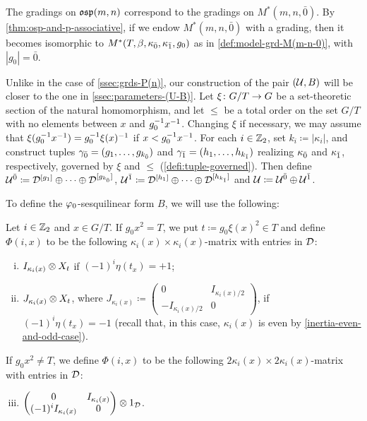The gradings on $\mathfrak{osp}(m,n)$ correspond to the gradings on $M^*(m, n, \bar 0)$. 
By \cref{thm:osp-and-p-associative}, if we endow $M^*(m, n, \bar 0)$ with a grading, then it becomes isomorphic to $M^*(T, \beta, \kappa_{\bar{0}}, \kappa_{\bar{1}}, g_0)$ as in \cref{def:model-grd-M(m-n-0)}, with $|g_0| = \bar 0$. 

Unlike in the case of \cref{ssec:grds-P(n)}, our construction of the pair $(\mathcal U, B)$ will be closer to the one in \cref{ssec:parameters-(U-B)}. 
Let $\xi\colon G/T \to G$ be a set-theoretic section of the natural homomorphism, and let $\leq$ be a total order on the set $G/T$ with no elements between $x$ and $g_0^{-1} x^{-1}$. 
Changing $\xi$ if necessary, we may assume that $\xi(g_0^{-1} x^{-1}) = g_0^{-1} \xi(x)^{-1}$ if $x < g_0^{-1} x^{-1}$. 
For each $i \in \mathbb{Z}_2$, set $k_i \coloneqq |\kappa_i|$, and construct tuples $\gamma_{\bar{0}} = (g_1, \ldots, g_{k_{\bar{0}}})$ and $\gamma_{\bar{1}} = (h_1, \ldots, h_{k_{\bar{1}}})$ realizing $\kappa_{\bar{0}}$ and $\kappa_{\bar{1}}$, respectively, governed by $\xi$ and $\leq$ (\cref{defi:tuple-governed}). 
Then define $\mathcal U^{\bar0} \coloneqq \mathcal{D}^{[g_1]} \oplus \cdots \oplus \mathcal{D}^{[g_{k_{\bar{0}}}]}$, $\mathcal U^{\bar1} \coloneqq \mathcal{D}^{[h_1]} \oplus \cdots \oplus \mathcal{D}^{[h_{k_{\bar{1}}}]}$ and $\mathcal U \coloneqq \mathcal U^{\bar0} \oplus \mathcal U^{\bar1}$. 

To define the $\varphi_0$-sesquilinear form $B$, we will use the following:

\begin{defi}\label{defi:blocks-of-Phi}
    Let $i\in \mathbb{Z}_2$ and $x \in G/T$. 
    If $g_0x^2 = T$, we put $t \coloneqq g_0 \xi(x)^2 \in T$ and define $\Phi(i, x)$ to be the following $\kappa_i(x) \times \kappa_i(x)$-matrix with entries in $\mathcal{D}$:
    \begin{enumerate}[(i)]
        \item $I_{\kappa_i(x)} \otimes X_{t}$ if $(-1)^i \eta(t_x) = +1$;
		\item  $J_{\kappa_i(x)} \otimes X_{t}$, where $J_{\kappa_i(x)} \coloneqq \begin{pmatrix}
				      0                & I_{\kappa_i(x)/2} \\
				      -I_{\kappa_i(x)/2} & 0
			      \end{pmatrix}$, if  $(-1)^i \eta(t_x) = -1$ (recall that, in this case, $\kappa_i(x)$ is even by \cref{inertia-even-and-odd-case}). 
	\end{enumerate}
    If $g_0 x^2 \neq T$, we define $\Phi(i, x)$ to be the following $2\kappa_i(x) \times 2\kappa_i(x)$-matrix with entries in $\mathcal{D}$:
    \begin{enumerate}[(i)]
        \setcounter{enumi}{2}
		\item $\begin{pmatrix}
			0                                                  & I_{\kappa_i(x)} \\
			(-1)^{i} I_{\kappa_i(x)} & 0
		\end{pmatrix} \otimes 1_{\mathcal{D}}$. 
    \end{enumerate}
\end{defi}

